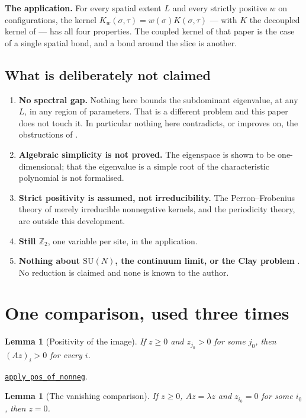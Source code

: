\documentclass[11pt]{article}
\newtheorem{lemma}[theorem]{Lemma}
\theoremstyle{definition}
\newcommand{\anchor}{08a9050201287a31d20fc4339cc5c6c64b1391fb}
\newcommand{\osline}[3]{%
  \href{https://github.com/lluiseriksson/THE-ERIKSSON-PROGRAMME/blob/\anchor/YangMills/OS/#1.lean\#L#2}{\nolinkurl{#3}}}
\newcommand{\Z}{\mathbb{Z}}
\newcommand{\SU}{\mathrm{SU}}
\begin{document}
\medskip
\noindent\textbf{The application.}  For every spatial extent $L$ and every
strictly positive $w$ on configurations, the kernel
$K_w(\sigma,\tau)=w(\sigma)K(\sigma,\tau)$ --- with $K$ the decoupled kernel of
\cite{ErikssonSpatial} --- has all four properties.  The coupled kernel of that
paper is the case of a single spatial bond, and a bond around the slice is
another.

\subsection{What is deliberately not claimed}

\begin{enumerate}
\item \textbf{No spectral gap.}  Nothing here bounds the subdominant eigenvalue,
at any $L$, in any region of parameters.  That is a different problem and this
paper does not touch it.  In particular nothing here contradicts, or improves
on, the obstructions of \cite{ErikssonBirkhoff}.
\item \textbf{Algebraic simplicity is not proved.}  The eigenspace is shown to
be one-dimensional; that the eigenvalue is a simple root of the characteristic
polynomial is not formalised.
\item \textbf{Strict positivity is assumed, not irreducibility.}  The
Perron--Frobenius theory of merely irreducible nonnegative kernels, and the
periodicity theory, are outside this development.
\item \textbf{Still $\Z_2$}, one variable per site, in the application.
\item \textbf{Nothing about $\SU(N)$, the continuum limit, or the Clay problem}
\cite{Clay}.  No reduction is claimed and none is known to the author.
\end{enumerate}

\section{One comparison, used three times}

\begin{lemma}[Positivity of the image]\label{lem:img}
If $z\ge0$ and $z_{j_0}>0$ for some $j_0$, then $(Az)_i>0$ for every $i$.
\end{lemma}

\osline{PerronKernel}{78}{apply\_pos\_of\_nonneg}.

\begin{lemma}[The vanishing comparison]\label{lem:van}
If $z\ge0$, $Az=\lambda z$ and $z_{i_0}=0$ for some $i_0$, then $z=0$.
\end{lemma}
\end{document}
